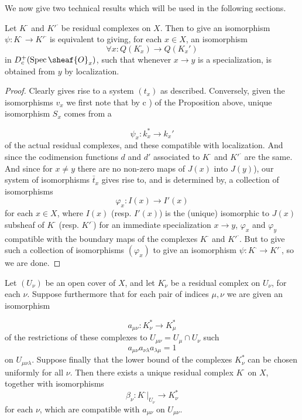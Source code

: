 \documentclass[12pt]{book}
\DeclareMathOperator{\Spec}{Spec}
\begin{document}
We now give two technical results which will be used in the following sections.

\begin{lemma}
Let \(K^{\cdot}\) and \(K'^{\cdot}\) be residual complexes on \(X\). Then to give an isomorphism \(\psi: K^{\cdot} \to K'^{\cdot}\) is equivalent to giving, for each \(x \in X\), an isomorphism
\[
\forall x: Q\left(K_{x}^{\cdot}\right) \to Q\left(K_{x}'\right)
\]
in \(D_{c}^{+}(\Spec \sheaf{O}_{x})\), such that whenever \(x \to y\) is a specialization, is obtained from \(y\) by localization.
\end{lemma}

\begin{proof}
Clearly gives rise to a system \((t_{x})\) as described. Conversely, given the isomorphisms \(v_{x}\) we first note that by c ) of the Proposition above, unique isomorphism \(S_x\) comes from a

\setcounter{page}{308}
\[
\psi_{x}: k_{x}^{*} \to k_{x}'
\]
of the actual residual complexes, and these compatible with localization. And since the codimension functions \(d\) and \(d'\) associated to \(K^{\cdot}\) and \(K'^{\cdot}\) are the same. And since for \(x \neq y\) there are no non-zero maps of \(J(x)\) into \(J(y)\)), our system of isomorphisms \(\bar{t}_{x}\) gives rise to, and is determined by, a collection of isomorphisms
\[
\varphi_{x}: I(x) \to I'(x)
\]
for each \(x \in X\), where \(I(x)\) (resp. \(I'(x)\)) is the (unique) isomorphic to \(J(x)\) subsheaf of \(K^{\cdot}\) (resp. \(K'^{\cdot}\)) for an immediate specialization \(x \to y\), \(\varphi_{x}\) and \(\varphi_{y}\) compatible with the boundary maps of the complexes \(K^{\cdot}\) and \(K'^{\cdot}\). But to give such a collection of isomorphisms \((\varphi_{x})\) to give an isomorphism \(\psi: K^{\cdot} \to K'^{\cdot}\), so we are done.
\end{proof}

\begin{lemma}
Let \((U_{\nu})\) be an open cover of \(X\), and let \(K_{\nu}^{\cdot}\) be a residual complex on \(U_{\nu}\), for each \(\nu\). Suppose furthermore that for each pair of indices \(\mu,\nu\) we are given an isomorphism

\setcounter{page}{309}
\[
a_{\mu \nu}: K_{\nu}^{*} \to K_{\mu}^{*}
\]
of the restrictions of these complexes to \(U_{\mu \nu}=U_{\mu} \cap U_{\nu}\) such
\[
a_{\mu \nu} a_{\nu \lambda} a_{\lambda \mu}=1
\]
on \(U_{\mu \nu \lambda}\). Suppose finally that the lower bound of the complexes \(K_{\nu}^{*}\) can be chosen uniformly for all \(\nu\). Then there exists a unique residual complex \(K^{\cdot}\) on \(X\), together with isomorphisms
\[
\beta_{\nu}:\left.K^{\cdot}\right|_{U_{\nu}} \to K_{\nu}^{*}
\]
for each \(\nu\), which are compatible with \(a_{\mu \nu}\) on \(U_{\mu \nu}\).
\end{lemma}
\end{document}
